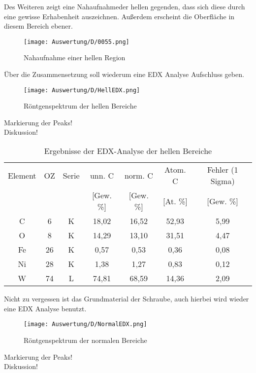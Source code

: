 \newpage
Des Weiteren zeigt eine Nahaufnahmeder hellen gegenden, dass sich diese durch eine gewisse Erhabenheit auszeichnen. Außerdem erscheint die Oberfläche in diesem Bereich ebener.
\begin{figure}[h]
    \centering
    \texttt{[image: Auswertung/D/0055.png]}
    \caption{Nahaufnahme einer hellen Region}
\end{figure}

\newpage
Über die Zusammensetzung soll wiederum eine EDX Analyse Aufschluss geben.
\begin{figure}[h]
    \centering
    \texttt{[image: Auswertung/D/HellEDX.png]}
    \caption{Röntgenspektrum der hellen Bereiche}
\end{figure}

Markierung der Peaks!\\
Diskussion!\\

\begin{table}[h]
    \centering
    \begin{tabular}{c|c|c|c|c|c|c}
        Element & OZ &Serie& unn. C & norm. C &  Atom. C  & Fehler (1 Sigma) \\
         & & & [Gew. \%] & [Gew. \%] & [At. \%] & [Gew. \%] \\
        \hline\hline
        C & 6 & K & 18,02 & 16,52 & 52,93 & 5,99\\
        O & 8 & K & 14,29 & 13,10 & 31,51 & 4,47\\
        Fe & 26 & K & 0,57 & 0,53 & 0,36 & 0,08\\
        Ni & 28 & K & 1,38 & 1,27 & 0,83 & 0,12\\
        W & 74 & L & 74,81 & 68,59 & 14,36 & 2,09
    \end{tabular}
    \caption{Ergebnisse der EDX-Analyse der hellen Bereiche}
\end{table}

\newpage
Nicht zu vergessen ist das Grundmaterial der Schraube, auch hierbei wird wieder eine EDX Analyse benutzt.
\begin{figure}[h]
    \centering
    \texttt{[image: Auswertung/D/NormalEDX.png]}
    \caption{Röntgenspektrum der normalen Bereiche}
\end{figure}

Markierung der Peaks!\\
Diskussion!\\

